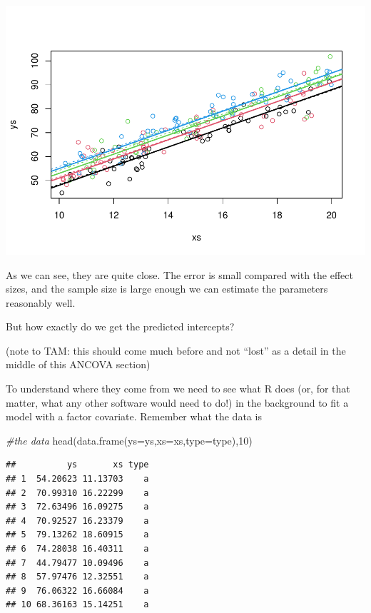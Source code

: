 \documentclass[
]{book}
\newenvironment{Shaded}{\begin{snugshade}}{\end{snugshade}}
\newcommand{\AttributeTok}[1]{\textcolor[rgb]{0.77,0.63,0.00}{#1}}
\newcommand{\CommentTok}[1]{\textcolor[rgb]{0.56,0.35,0.01}{\textit{#1}}}
\newcommand{\DecValTok}[1]{\textcolor[rgb]{0.00,0.00,0.81}{#1}}
\newcommand{\FunctionTok}[1]{\textcolor[rgb]{0.00,0.00,0.00}{#1}}
\newcommand{\NormalTok}[1]{#1}
\begin{document}
\includegraphics{ECOMODbook_files/figure-latex/a9.8-1.pdf}

As we can see, they are quite close. The error is small compared with the effect sizes, and the sample size is large enough we can estimate the parameters reasonably well.

But how exactly do we get the predicted intercepts?

(note to TAM: this should come much before and not ``lost'' as a detail in the middle of this ANCOVA section)

To understand where they come from we need to see what R does (or, for that matter, what any other software would need to do!) in the background to fit a model with a factor covariate. Remember what the data is

\begin{Shaded}
\begin{Highlighting}[]
\CommentTok{\#the data}
\FunctionTok{head}\NormalTok{(}\FunctionTok{data.frame}\NormalTok{(}\AttributeTok{ys=}\NormalTok{ys,}\AttributeTok{xs=}\NormalTok{xs,}\AttributeTok{type=}\NormalTok{type),}\DecValTok{10}\NormalTok{)}
\end{Highlighting}
\end{Shaded}

\begin{verbatim}
##          ys       xs type
## 1  54.20623 11.13703    a
## 2  70.99310 16.22299    a
## 3  72.63496 16.09275    a
## 4  70.92527 16.23379    a
## 5  79.13262 18.60915    a
## 6  74.28038 16.40311    a
## 7  44.79477 10.09496    a
## 8  57.97476 12.32551    a
## 9  76.06322 16.66084    a
## 10 68.36163 15.14251    a
\end{verbatim}
\end{document}
